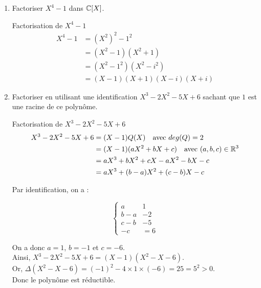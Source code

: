 \begin{enumerate}
    \item Factoriser $X^4 - 1$ dans $\mathbb{C}[X]$.

    \begin{theorem}[black]{Factorisation de $X^4 - 1$}
        \begin{align*}
            X^4 - 1 &= (X^2)^2 - 1^2 \\
            &= (X^2 - 1)(X^2 + 1) \\
            &= (X^2 - 1^2)(X^2 - i^2) \\
            &= (X - 1)(X + 1)(X - i)(X + i)
        \end{align*}
    \end{theorem}
    
    \item Factoriser en utilisant une identification $X^3 - 2X^2 - 5X + 6$ sachant que $1$ est une racine de ce polynôme.

    \begin{theorem}[black]{Factorisation de $X^3 - 2X^2 - 5X + 6$}
        \begin{align*}
            X^3 - 2X^2 - 5X + 6 &= (X - 1)Q(X) \hspace{10px} \text{avec } deg(Q) = 2 \\
            &= (X - 1)(aX^2 + bX + c) \hspace{10px} \text{avec } (a, b, c) \in \ensR^3 \\
            &= aX^3 + bX^2 + cX - aX^2 - bX - c \\
            &= aX^3 + (b - a)X^2 + (c - b)X - c
        \end{align*}

        \noindent Par identification, on a :

        $$
            \left\{
                \begin{array}{ll}
                    a & 1 \\
                    b - a & -2 \\
                    c - b & -5 \\
                    -c &= 6
                \end{array}
            \right.
        $$

        \noindent On a donc $a = 1$, $b = -1$ et $c = -6$. \\
        Ainsi, $X^3 - 2X^2 - 5X + 6 = (X - 1)(X^2 - X - 6)$. \\
        Or, $\Delta(X^2 - X - 6) = (-1)^2 - 4 \times 1 \times (-6) = 25 = 5^2 > 0$. \\
        Donc le polynôme est réductible. \\
        

\end{theorem}
\end{enumerate}

